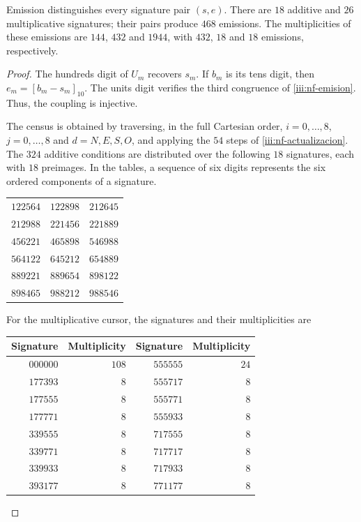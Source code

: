 \begin{proposition}
\label{iii:nf-inyectividad}
Emission distinguishes every signature pair $(s,e)$. There are $18$ additive
and $26$ multiplicative signatures; their pairs produce $468$ emissions.
The multiplicities of these emissions are $144$, $432$ and $1944$,
with $432$, $18$ and $18$ emissions, respectively.
\end{proposition}

\begin{proof}
The hundreds digit of $U_m$ recovers $s_m$. If $b_m$ is its
tens digit, then $e_m=[b_m-s_m]_{10}$. The units digit verifies
the third congruence of \eqref{iii:nf-emision}. Thus, the
coupling is injective.

The census is obtained by traversing, in the full Cartesian order,
$i=0,\ldots,8$, $j=0,\ldots,8$ and $d=N,E,S,O$, and applying the $54$
steps of \eqref{iii:nf-actualizacion}. The $324$ additive conditions
are distributed over the following $18$ signatures, each with $18$
preimages. In the tables, a sequence of six digits represents
the six ordered components of a signature.
\begin{center}
\begin{tabular}{ccc}
$122564$&$122898$&$212645$\\
$212988$&$221456$&$221889$\\
$456221$&$465898$&$546988$\\
$564122$&$645212$&$654889$\\
$889221$&$889654$&$898122$\\
$898465$&$988212$&$988546$
\end{tabular}
\end{center}
For the multiplicative cursor, the signatures and their multiplicities are
\begin{center}
\begin{tabular}{rr@{\qquad}rr}
Signature&Multiplicity&Signature&Multiplicity\\ \hline
$000000$&$108$&$555555$&$24$\\
$177393$&$8$&$555717$&$8$\\
$177555$&$8$&$555771$&$8$\\
$177771$&$8$&$555933$&$8$\\
$339555$&$8$&$717555$&$8$\\
$339771$&$8$&$717717$&$8$\\
$339933$&$8$&$717933$&$8$\\
$393177$&$8$&$771177$&$8$\\

\end{tabular}
\end{center}
\end{proof}
